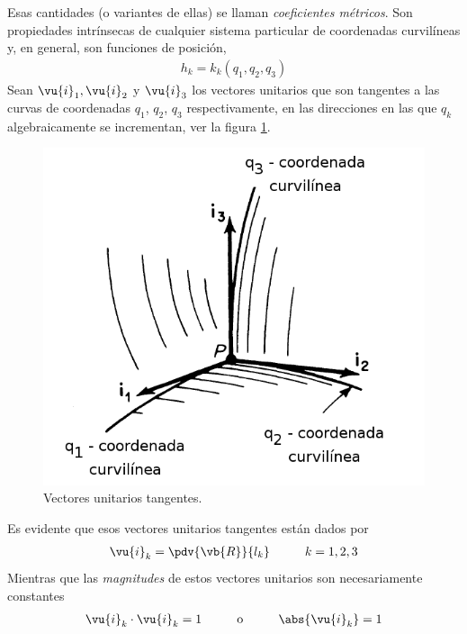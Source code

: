 Esas cantidades (o variantes de ellas) se llaman \emph{coeficientes métricos}. Son propiedades intrínsecas de cualquier sistema particular de coordenadas curvilíneas y, en general, son funciones de posición,
\begin{align*}
h_{k} = k_{k} (q_{1}, q_{2}, q_{3})
\end{align*}
Sean $\vu{i}_{1}, \vu{i}_{2}$ y $\vu{i}_{3}$ los vectores unitarios que son tangentes a las curvas de coordenadas $q_{1}$, $q_{2}$, $q_{3}$ respectivamente, en las direcciones en las que $q_{k}$ algebraicamente se incrementan, ver la figura \ref{fig:figura_A_02}.
\begin{figure}[H]
    \centering
    \includegraphics[scale=0.4]{Imagenes/CoordenadasCurvilineas_02.png}
    \caption{Vectores unitarios tangentes.}
    \label{fig:figura_A_02}
\end{figure}
Es evidente que esos vectores unitarios tangentes están dados por
\begin{align}
\vu{i}_{k} = \pdv{\vb{R}}{l_{k}} \hspace{1cm} k = 1, 2, 3
\label{eq:ecuacion_A_01_05}    
\end{align}
Mientras que las \emph{magnitudes} de estos vectores unitarios son necesariamente constantes
\begin{align}
\vu{i}_{k} \cdot \vu{i}_{k} =  1 \hspace{1cm} \mbox{o} \hspace{1cm} \abs{\vu{i}_{k}} = 1
\label{eq:ecuacion_A_01_06}
\end{align}
